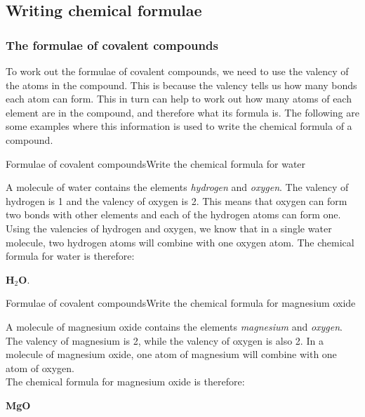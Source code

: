             \subsection{ Writing chemical formulae}
            \nopagebreak
      \label{m38689*uid97}
            \subsubsection{ The formulae of covalent compounds}
            \nopagebreak
        \label{m38689*id143689}To work out the formulae of covalent compounds, we need to use the valency of the atoms in the compound. This is because the valency tells us how many bonds each atom can form. This in turn can help to work out how many atoms of each element are in the compound, and therefore what its formula is. The following are some examples where this information is used to write the chemical formula of a compound.\par 
\begin{wex}{Formulae of covalent compounds}{Write the chemical formula for water\\}
{
A molecule of water contains the elements \textit{hydrogen} and \textit{oxygen}.
The valency of hydrogen is 1 and the valency of oxygen is 2. This means that oxygen can form two bonds with other elements and each of the hydrogen atoms can form one.
Using the valencies of hydrogen and oxygen, we know that in a single water molecule, two hydrogen atoms will combine with one oxygen atom. The chemical formula for water is therefore:
\begin{center}
\textbf{H$_2$O}.
\end{center}}
\end{wex}

\begin{wex}{Formulae of covalent compounds}{Write the chemical formula for magnesium oxide\\}
{
 A molecule of magnesium oxide contains the elements \textit{magnesium} and \textit{oxygen}.  
The valency of magnesium is 
2, while the valency of oxygen is also 2. In a molecule of magnesium oxide, one atom of magnesium will combine with one atom 
of oxygen. \\
The chemical formula for magnesium oxide is therefore: 

\begin{center}
\textbf{MgO}
\end{center}}
\end{wex}

